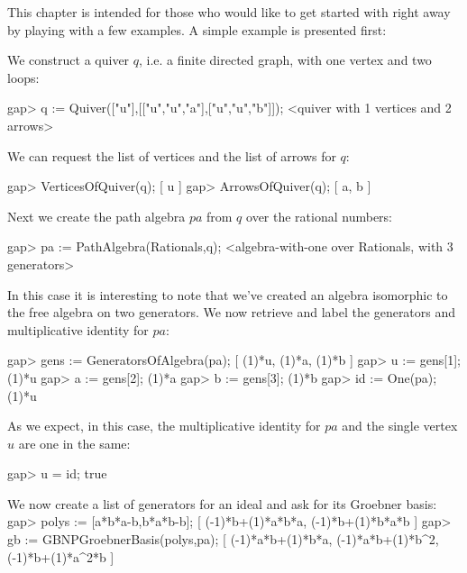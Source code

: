 %
%
%

This chapter is intended for those who would like to get started with {\QPA}
right away by playing with a few examples.  A simple example is presented first:


We construct a quiver $q$, i.e. a finite directed graph, with one
vertex and two loops:

\beginexample 
gap> q := Quiver(["u"],[["u","u","a"],["u","u","b"]]);
<quiver with 1 vertices and 2 arrows>
\endexample

We can request the list of vertices and the list of arrows for $q$:

\beginexample 
gap> VerticesOfQuiver(q);
[ u ]
gap> ArrowsOfQuiver(q);
[ a, b ]
\endexample

Next we create the path algebra $pa$ from $q$ over the rational numbers:

\beginexample 
gap> pa := PathAlgebra(Rationals,q);
<algebra-with-one over Rationals, with 3 generators>
\endexample

In this case it is interesting to note that we've created an algebra isomorphic
to the free algebra on two generators.  We now retrieve and label the
generators and multiplicative identity for $pa$:

\beginexample
gap> gens := GeneratorsOfAlgebra(pa);
[ (1)*u, (1)*a, (1)*b ]
gap> u := gens[1];
(1)*u
gap> a := gens[2];
(1)*a
gap> b := gens[3];
(1)*b
gap> id := One(pa);
(1)*u
\endexample

As we expect, in this case, the multiplicative identity for $pa$ and the single
vertex $u$ are one in the same:

\beginexample 
gap> u = id;
true
\endexample

We now create a list of generators for an ideal and ask for its Groebner basis:
\beginexample
gap> polys := [a*b*a-b,b*a*b-b];
[ (-1)*b+(1)*a*b*a, (-1)*b+(1)*b*a*b ]
gap> gb := GBNPGroebnerBasis(polys,pa);
[ (-1)*a*b+(1)*b*a, (-1)*a*b+(1)*b^2, (-1)*b+(1)*a^2*b ]
\endexample

